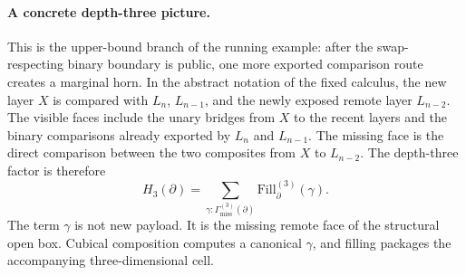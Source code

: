 \documentclass{lmcs}
\begin{document}
\paragraph{A concrete depth-three picture.}
This is the upper-bound branch of the running example: after the
swap-respecting binary boundary is public, one more exported comparison route
creates a marginal horn.  In the abstract notation of the fixed calculus, the
new layer \(X\) is compared with \(L_n\), \(L_{n-1}\), and the newly exposed
remote layer \(L_{n-2}\).  The visible faces include the unary bridges from
\(X\) to the recent layers and the binary comparisons already exported by
\(L_n\) and \(L_{n-1}\).  The missing face is the direct comparison between the
two composites from \(X\) to \(L_{n-2}\).  The depth-three factor is therefore
\[
  H_3(\partial)
  =
  \sum_{\gamma:\Gamma_{\mathrm{miss}}^{(3)}(\partial)}
  \mathrm{Fill}^{(3)}_{\partial}(\gamma).
\]
The term \(\gamma\) is not new payload.  It is the missing remote face of the structural open
box.  Cubical composition computes a canonical \(\gamma\), and filling packages the
accompanying three-dimensional cell.
\end{document}
